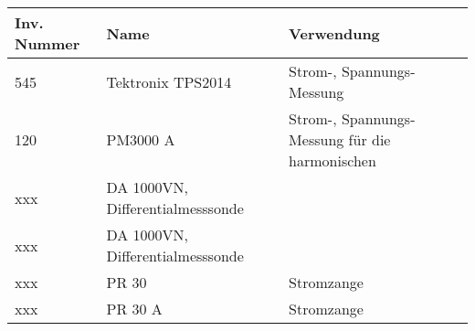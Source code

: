
\begin{tabular}{ l | l | l }
  \hline 
  Inv. Nummer & Name & Verwendung \\
  \hline \hline
  545 & Tektronix TPS2014 & Strom-, Spannungs-Messung  \\
  \hline
  120 & PM3000 A & Strom-, Spannungs-Messung für die harmonischen  \\  
  \hline
  
  xxx & DA 1000VN, Differentialmesssonde  \\  
  \hline
  xxx & DA 1000VN, Differentialmesssonde  \\  
  \hline
  
  xxx & PR 30 & Stromzange  \\  
  \hline
  xxx & PR 30 A & Stromzange  \\  
  \hline
  
\end{tabular}



\noindent
